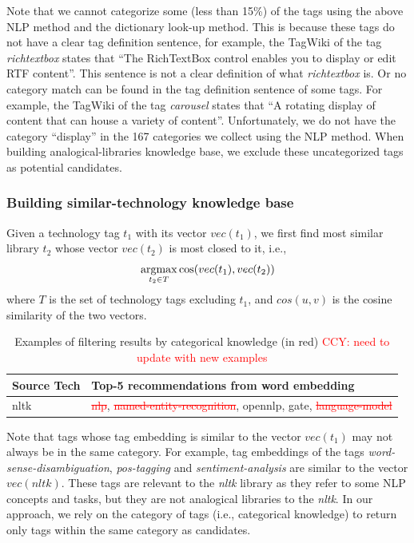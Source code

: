 Note that we cannot categorize some (less than 15\%) of the tags using the above NLP method and the dictionary look-up method.
This is because these tags do not have a clear tag definition sentence, for example, the TagWiki of the tag \textit{richtextbox} states that ``The RichTextBox control enables you to display or edit RTF content''.
This sentence is not a clear definition of what \textit{richtextbox} is.
Or no category match can be found in the tag definition sentence of some tags.
For example, the TagWiki of the tag \textit{carousel} states that ``A rotating display of content that can house a variety of content''.
Unfortunately, we do not have the category ``display'' in the 167 categories we collect using the NLP method.
When building analogical-libraries knowledge base, we exclude these uncategorized tags as potential candidates.

\subsubsection{Building similar-technology knowledge base}
Given a technology tag $t_1$ with its vector $vec(t_1)$, we first find most similar library $t_2$ whose vector $vec(t_2)$ is most closed to it, i.e.,
\begin{equation}
	\operatornamewithlimits{argmax}_{t_2 \in T}  \cos (vec(t_1), vec(t_2)) 
	\label{equ:similarity}
\end{equation} 
where $T$ is the set of technology tags excluding $t_1$, and $cos(u, v)$ is the cosine similarity of the two vectors.

\begin{table}
	\scriptsize
	\center	
	\begin{tabular}{l|l}
		\hline
		\textbf{Source Tech} & \textbf{Top-5 recommendations from word embedding} \\
		\hline
		nltk      & \textcolor{red}{\st{nlp}}, \textcolor{red}{\st{named-entity-recognition}}, opennlp, gate, \textcolor{red}{\st{language-model}} \\
				\hline
	\end{tabular}
	\vspace{1mm}
	\caption{Examples of filtering results by categorical knowledge (in red) \textcolor{red}{CCY: need to update with new examples}}
	\label{tab:filterResult}
\end{table}

Note that tags whose tag embedding is similar to the vector $vec(t_1)$ may not always be in the same category.
For example, tag embeddings of the tags \textit{word-sense-disambiguation}, \textit{pos-tagging} and \textit{sentiment-analysis} are similar to the vector $vec(nltk)$.
These tags are relevant to the \textit{nltk} library as they refer to some NLP concepts and tasks, but they are not analogical libraries to the \textit{nltk}.
In our approach, we rely on the category of tags (i.e., categorical knowledge) to return only tags within the same category as candidates.


